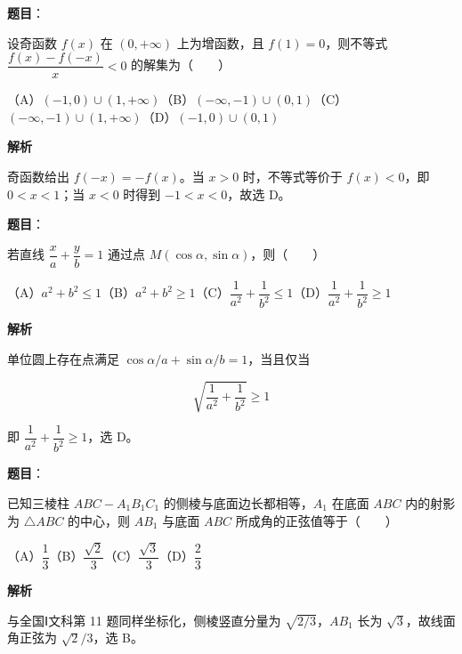\begin{answer}

\textbf{题目}：

设奇函数 $f(x)$ 在 $(0,+\infty)$ 上为增函数，且 $f(1)=0$，则不等式 $\dfrac{f(x)-f(-x)}{x}<0$ 的解集为\mbox{（　　）}

（A）$(-1,0)\cup(1,+\infty)$\quad（B）$(-\infty,-1)\cup(0,1)$\quad（C）$(-\infty,-1)\cup(1,+\infty)$\quad（D）$(-1,0)\cup(0,1)$

\textbf{解析}

奇函数给出 $f(-x)=-f(x)$。当 $x>0$ 时，不等式等价于 $f(x)<0$，即 $0<x<1$；当 $x<0$ 时得到 $-1<x<0$，故选 D。


\end{answer}
\begin{answer}

\textbf{题目}：

若直线 $\dfrac{x}{a}+\dfrac{y}{b}=1$ 通过点 $M(\cos\alpha,\sin\alpha)$，则\mbox{（　　）}

（A）$a^2+b^2\leqslant1$\quad（B）$a^2+b^2\geqslant1$\quad（C）$\dfrac1{a^2}+\dfrac1{b^2}\leqslant1$\quad（D）$\dfrac1{a^2}+\dfrac1{b^2}\geqslant1$

\textbf{解析}

单位圆上存在点满足 $\cos\alpha/a+\sin\alpha/b=1$，当且仅当

\nopagebreak[4]
\[
\sqrt{\frac1{a^2}+\frac1{b^2}}\geqslant1
\]

即 $\dfrac1{a^2}+\dfrac1{b^2}\geqslant1$，选 D。


\end{answer}
\begin{answer}

\textbf{题目}：

已知三棱柱 $ABC-A_1B_1C_1$ 的侧棱与底面边长都相等，$A_1$ 在底面 $ABC$ 内的射影为 $\triangle ABC$ 的中心，则 $AB_1$ 与底面 $ABC$ 所成角的正弦值等于\mbox{（　　）}

（A）$\dfrac13$\quad（B）$\dfrac{\sqrt2}{3}$\quad（C）$\dfrac{\sqrt3}{3}$\quad（D）$\dfrac23$

\textbf{解析}

与全国Ⅰ文科第 11 题同样坐标化，侧棱竖直分量为 $\sqrt{2/3}$，$AB_1$ 长为 $\sqrt3$，故线面角正弦为 $\sqrt2/3$，选 B。


\end{answer}
